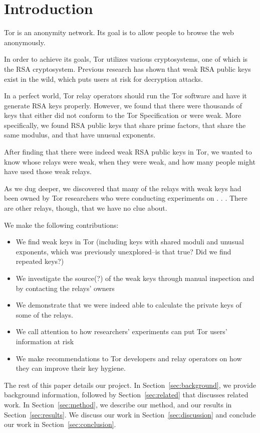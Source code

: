 \section{Introduction}
Tor is an anonymity network.  Its goal is to allow people to browse 
the web anonymously.

In order to achieve its goals, Tor utilizes various cryptosystems, 
one of which is the RSA cryptosystem.  Previous research has 
shown that weak RSA public keys exist in the wild, which puts users at 
risk for decryption attacks.  

In a perfect world, Tor relay operators should run the Tor software and have it 
generate RSA keys properly. However, we found that there were thousands of keys 
that either did not conform to the Tor Specification or were weak.  More 
specifically, we found RSA public keys that share prime factors, 
that share the same modulus, and that have unusual exponents.

After finding that there were indeed weak RSA public keys in Tor, we wanted 
to know whose relays were weak, when they were weak, and how many people might 
have used those weak relays.

As we dug deeper, we discovered that many of the relays with weak keys had been owned 
by Tor researchers who were conducting experiments on . . . There are other 
relays, though, that we have no clue about.

We make the following contributions:
\begin{itemize}
  \item We find weak keys in Tor (including keys with shared moduli 
    and unusual exponents, which was previously unexplored--is that true?
    Did we find repeated keys?)
  \item We investigate the source(?) of the weak keys through manual inspection and by 
    contacting the relays' owners
  \item We demonstrate that we were indeed able to calculate the private keys of 
    some of the relays.
  \item We call attention to how researchers' experiments can put Tor users'
    information at risk
  \item We make recommendations to Tor developers and relay operators on how they can 
    improve their key hygiene.
\end{itemize}

The rest of this paper details our project.  In Section~\ref{sec:background}, we
provide background information, followed by Section~\ref{sec:related} that
discusses related work.  In Section~\ref{sec:method}, we describe our method,
and our results in Section~\ref{sec:results}.  We discuss our work in
Section~\ref{sec:discussion} and conclude our work in
Section~\ref{sec:conclusion}.
